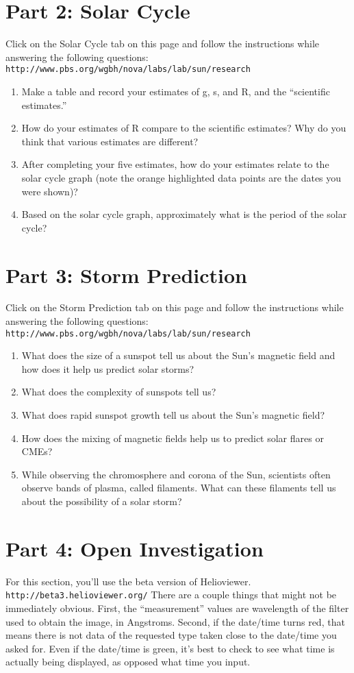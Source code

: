 \documentclass[11pt]{article}%
\begin{document}
\section*{Part 2: Solar Cycle}
Click on the Solar Cycle tab on this page and follow the instructions while answering the following questions: {\tt http://www.pbs.org/wgbh/nova/labs/lab/sun/research}
\begin{enumerate}
\item Make a table and record your estimates of g, s, and R, and the ``scientific estimates.''
 \item How do your estimates of R compare to the scientific estimates? Why do you think that various estimates are different?
 \item  After completing your five estimates, how do your estimates relate to the solar cycle graph (note the orange highlighted data points are the dates you were shown)?
 \item Based on the solar cycle graph, approximately what is the period of the solar cycle?
 \end{enumerate}

\section*{Part 3: Storm Prediction}
Click on the Storm Prediction tab on this page and follow the instructions while answering the following questions: {\tt http://www.pbs.org/wgbh/nova/labs/lab/sun/research}
\begin{enumerate}
\item  What does the size of a sunspot tell us about the Sun's magnetic field and how does it help us predict solar storms?
\item  What does the complexity of sunspots tell us?
\item What does rapid sunspot growth tell us about the Sun's magnetic field?
\item  How does the mixing of magnetic fields help us to predict solar flares or CMEs?
\item While observing the chromosphere and corona of the Sun, scientists often observe bands of plasma, called filaments. What can these filaments tell us about the possibility of a solar storm?
\end{enumerate}


\section*{Part 4: Open Investigation}
For this section, you'll use the beta version of Helioviewer. {\tt http://beta3.helioviewer.org/}
There are a couple things that might not be immediately obvious. First, the ``measurement'' values are wavelength of the filter used to obtain the image, in Angstroms. Second, if the date/time turns red, that means there is not data of the requested type taken close to the date/time you asked for. Even if the date/time is green, it's best to check to see what time is actually being displayed, as opposed what time you input. 
\end{document}
